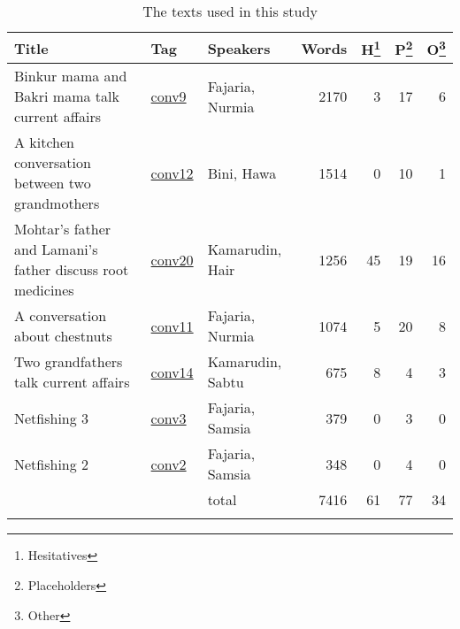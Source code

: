 \documentclass[output=paper,colorlinks,citecolor=brown
\ChapterDOI{10.5281/zenodo.15697587}
]{langscibook}
\begin{document}
\begin{table}
\caption{The texts used in this study}
\label{tab:data}
 \begin{tabularx}{\textwidth}{Q l p{} rrrr}
  \lsptoprule
    Title & Tag  & Speakers & Words & H\footnote{Hesitatives} & P\footnote{Placeholders}& O\footnote{Other}\\\midrule
    Binkur mama and Bakri mama talk current affairs  &  \href{http://hdl.handle.net/10050/00-0000-0000-0004-1B9F-F}{conv9}  &    Fajaria, Nurmia  &  2170      & 3 & 17 & 6\\
    A kitchen conversation between two grandmothers & \href{http://hdl.handle.net/10050/00-0000-0000-0004-1BBD-5}{conv12}&Bini, Hawa &1514&0&10&1\\
    Mohtar's father and Lamani's father discuss root medicines & \href{http://hdl.handle.net/10050/00-0000-0000-0004-1BCA-4}{conv20} &Kamarudin, Hair& 1256 &45&19&16\\
    A conversation about chestnuts&\href{http://hdl.handle.net/10050/00-0000-0000-0004-1BA2-F}{conv11}&Fajaria, Nurmia&1074&5&20&8\\
    Two grandfathers talk current affairs & \href{http://hdl.handle.net/10050/00-0000-0000-0004-1B93-C}{conv14} & Kamarudin, Sabtu & 675&8&4&3\\ 
    Netfishing 3 & \href{https://hdl.handle.net/10050/00-0000-0000-0004-1BCD-C}{conv3} &Fajaria, Samsia&379&0&3&0\\
    Netfishing 2 & \href{https://hdl.handle.net/10050/00-0000-0000-0004-1BCC-E}{conv2} &Fajaria, Samsia&348&0&4&0\\\midrule
    &&total&7416&61&77&34\\\lspbottomrule
 \end{tabularx}
\end{table}
\end{document}
